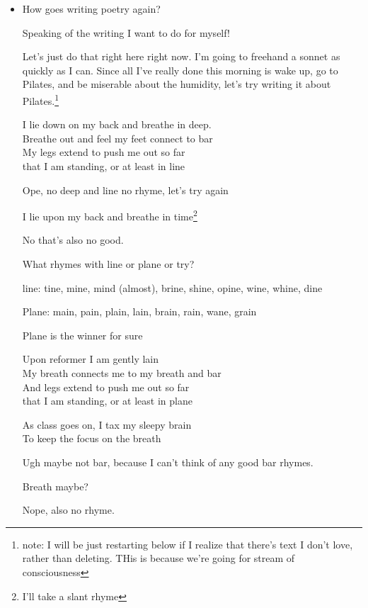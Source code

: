 \documentclass[12pt]{article}
\renewcommand{\,}{\textsuperscript{,}}
\begin{document}
\begin{itemize}
\begin{itemize}
\begin{itemize}
\item How goes writing poetry again?

Speaking of the writing I want to do for myself!

Let's just do that right here right now. I'm going to freehand a sonnet as quickly as I can.  
Since all I've really done this morning is wake up, go to Pilates, and be miserable about the humidity, let's try writing it about Pilates.\footnote{note: I will be just restarting below if I realize that there's text I don't love, rather than deleting. THis is because we're going for stream of consciousness}

I lie down on my back and breathe in deep.\\  
Breathe out and feel my feet connect to bar\\  
My legs extend to push me out so far\\  
that I am standing, or at least in line\\

\hline

Ope, no deep and line no rhyme, let's try again

\hline

I lie upon my back and breathe in time\footnote{I'll take a slant rhyme}

\hline

No that's also no good.

What rhymes with line or plane or try?

line: tine, mine, mind (almost), brine, shine, opine, wine, whine, dine

Plane: main, pain, plain, lain, brain, rain, wane, grain

Plane is the winner for sure

\hline

Upon reformer I am gently lain\\  
My breath connects me to my breath and bar\\  
And legs extend to push me out so far\\  
that I am standing, or at least in plane

\noindent As class goes on, I tax my sleepy brain\\  
To keep the focus on the breath\\  
\hline

Ugh maybe not bar, because I can't think of any good bar rhymes.

Breath maybe?

Nope, also no rhyme.


\end{itemize}
\end{itemize}
\end{itemize}
\end{document}
